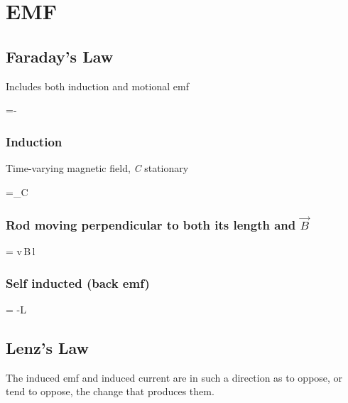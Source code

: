 \documentclass[\mainfilename]{subfiles}
\begin{document}
\begin{sectionBox}
\begin{multicols}{2}
    \end{multicols}

    \section*{EMF}

    \subsection{Faraday's Law}
    Includes both induction and motional emf
    \begin{BM}
        =-
    \end{BM}

    \begin{multicols}{2}
        
        \subsubsection{Induction}
        Time-varying magnetic field, \textit{C} stationary
        \begin{BM}
            =\oint_{C}{\cdot{}}
        \end{BM}
    
        \subsubsection{Rod moving perpendicular to both its length and \(\vec{B}\)}
        \begin{BM}
            = v\,B\,l
        \end{BM}
        
    \end{multicols}

    \subsubsection{Self inducted (back emf)}
    \begin{BM}
        = -L\,
    \end{BM}

    \subsection{Lenz's Law}
    The induced emf and induced current are in such a direction as to oppose, or tend to oppose, the change that produces them.


\end{sectionBox}
\end{document}
